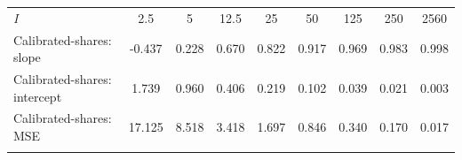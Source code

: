 \begin{tabular}{lcccccccc}
\hline \noalign{\smallskip}\textit{I} & 2.5 & 5 & 12.5 & 25 & 50 & 125 & 250 & 2560\\
\noalign{\smallskip}\hline \noalign{\smallskip}Calibrated-shares: slope & -0.437 & 0.228 & 0.670 & 0.822 & 0.917 & 0.969 & 0.983 & 0.998\\
Calibrated-shares: intercept & 1.739 & 0.960 & 0.406 & 0.219 & 0.102 & 0.039 & 0.021 & 0.003\\
Calibrated-shares: MSE & 17.125 & 8.518 & 3.418 & 1.697 & 0.846 & 0.340 & 0.170 & 0.017\\
\noalign{\smallskip}\hline\end{tabular}
